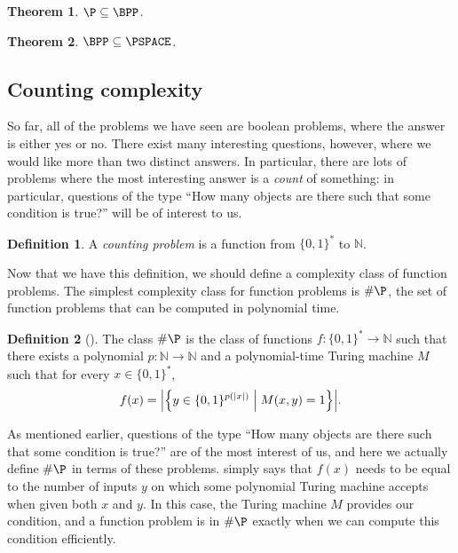 \documentclass[english,12pt]{reedthesis}
\theoremstyle{plain}
\newtheorem{thm}{Theorem}[section]
\theoremstyle{definition}
\newtheorem{defn}[defn]{Definition}
\theoremstyle{remark}
\DeclarePairedDelimiter{\abs}{\lvert}{\rvert}
\newcommand{\middlemid}{%
  \ensuremath{\;\middle\vert\;}
}
\begin{document}
\begin{thm}\label{thm:p-subset-bpp}
  $\P \subseteq \BPP$.
\end{thm}

\begin{thm}\label{thm:bpp-subset-pspace}
  $\BPP \subseteq \PSPACE$.
\end{thm}

\subsection{Counting complexity}

So far, all of the problems we have seen are boolean problems, where the answer
is either yes or no. There exist many interesting questions, however, where we
would like more than two distinct answers. In particular, there are lots of
problems where the most interesting answer is a \emph{count} of something: in
particular, questions of the type ``How many objects are there such that some
condition is true?'' will be of interest to us.

\begin{defn}\label{def:counting-problem}
  A \emph{counting problem} is a function from $\{0, 1\}^{*}$ to $\mathbb{N}$.
\end{defn}

Now that we have this definition, we should define a complexity class of
function problems. The simplest complexity class for function problems is
$\#\P$, the set of function problems that can be computed in polynomial time.

\begin{defn}[{\cite[Def.\ 9.2]{AB09}}]\label{def:hash-p}
  The class $\#\P$ is the class of functions $f\colon \{0, 1\}^{*} \rightarrow \mathbb{N}$ such
  that there exists a polynomial $p\colon \mathbb{N} \rightarrow \mathbb{N}$ and a polynomial-time
  Turing machine $M$ such that for every $x \in \{0, 1\}^{*}$,
  \begin{equation}\label{eqn:hash-p}
    f(x) = \abs*{\mleft\{y \in \{0, 1\}^{p(\abs{x})} \middlemid M(x, y) = 1\mright\}}.
  \end{equation}
\end{defn}

As mentioned earlier, questions of the type ``How many objects are there such
that some condition is true?'' are of the most interest of us, and here we
actually define $\#\P$ in terms of these problems.  simply says
that $f(x)$ needs to be equal to the number of inputs $y$ on which some
polynomial Turing machine accepts when given both $x$ and $y$. In this case, the
Turing machine $M$ provides our condition, and a function problem is in $\#\P$
exactly when we can compute this condition efficiently.
\end{document}
